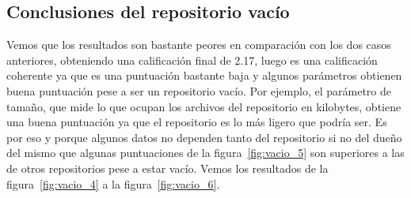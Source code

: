 \documentclass[a4paper, 12pt]{book}
\begin{document}
\subsection{Conclusiones del repositorio vacío}
Vemos que los resultados son bastante peores en comparación con los dos casos anteriores, obteniendo una calificación final de 2.17, luego es una calificación coherente ya que es una puntuación bastante baja y algunos parámetros obtienen buena puntuación pese a ser un repositorio vacío. Por ejemplo, el parámetro de tamaño, que mide lo que ocupan los archivos del repositorio en kilobytes, obtiene una buena puntuación ya que el repositorio es lo más ligero que podría ser. Es por eso y porque algunos datos no dependen tanto del repositorio si no del dueño del mismo que algunas puntuaciones de la figura~\ref{fig:vacio_5} son superiores a las de otros repositorios pese a estar vacío. Vemos los resultados de la figura~\ref{fig:vacio_4} a la figura~\ref{fig:vacio_6}.
\end{document}
